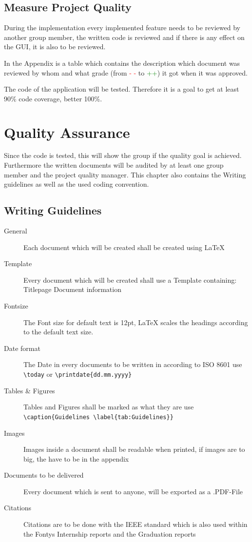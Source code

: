 \documentclass[12pt]{article}
\begin{document}
\subsection{Measure Project Quality}
During the implementation every implemented feature needs to be reviewed by another group member, the written code is reviewed and if there is any effect on the GUI, it is also to be reviewed. 

In the Appendix is a table which contains the description which document was reviewed by whom and what grade (from \textcolor{red}{- -} to \textcolor{green}{++}) it got when it was approved.

The code of the application will be tested. Therefore it is a goal to get at least 90\% code coverage, better 100\%. 
\clearpage
\section{Quality Assurance}
Since the code is tested, this will show the group if the quality goal is achieved. Furthermore the written documents will be audited by at least one group member and the project quality manager. This chapter also contains the Writing guidelines as well as the used coding convention.
\subsection{Writing Guidelines}
\begin{description}
	\item[General] Each document which will be created shall be created using LaTeX
	\item[Template] Every document which will be created shall use a Template containing:
	\subitem Titlepage
	\subitem Document information
	\item[Fontsize] The Font size for default text is 12pt, LaTeX scales the headings according to the default text size.
	\item[Date format] The Date in every documents to be written in according to ISO 8601
	\subitem use \verb|\today| or \verb|\printdate{dd.mm.yyyy}|
	\item[Tables \& Figures] Tables and Figures shall be marked as what they are
	\subitem use \verb|\caption{Guidelines \label{tab:Guidelines}}|
	\item[Images] Images inside a document shall be readable when printed, if images are to big, the have to be in the appendix
	\item[Documents to be delivered] Every document which is sent to anyone, will be exported as a .PDF-File
	\item[Citations] Citations are to be done with the IEEE standard which is also used within the Fontys Internship reports and the Graduation reports
	
\end{description}
\end{document}
